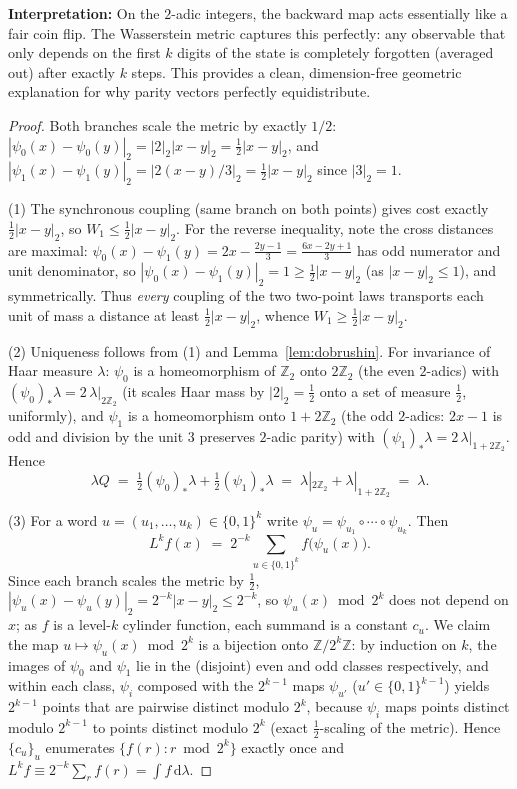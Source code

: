\documentclass[11pt]{amsart}
\theoremstyle{definition}
\theoremstyle{remark}
\newcommand{\Z}{\mathbb{Z}}
\newcommand{\Ztwo}{\Z_2}
\newcommand{\dW}{W_1}
\begin{document}
\textbf{Interpretation:}
On the $2$-adic integers, the backward map acts essentially like a fair coin flip. The Wasserstein metric captures this perfectly: any observable that only depends on the first $k$ digits of the state is completely forgotten (averaged out) after exactly $k$ steps. This provides a clean, dimension-free geometric explanation for why parity vectors perfectly equidistribute.

\begin{proof}
Both branches scale the metric by exactly $1/2$: $|\psi_0(x)-\psi_0(y)|_2 = |2|_2 |x-y|_2 = \tfrac12|x-y|_2$, and $|\psi_1(x)-\psi_1(y)|_2 = |2(x-y)/3|_2 = \tfrac12 |x-y|_2$ since $|3|_2 = 1$.

(1) The synchronous coupling (same branch on both points) gives cost exactly $\tfrac12|x-y|_2$, so $\dW \le \tfrac12 |x-y|_2$. For the reverse inequality, note the cross distances are maximal: $\psi_0(x) - \psi_1(y) = 2x - \tfrac{2y-1}{3} = \tfrac{6x - 2y + 1}{3}$ has odd numerator and unit denominator, so $|\psi_0(x)-\psi_1(y)|_2 = 1 \ge \tfrac12|x-y|_2$ (as $|x-y|_2 \le 1$), and symmetrically. Thus \emph{every} coupling of the two two-point laws transports each unit of mass a distance at least $\tfrac12|x-y|_2$, whence $\dW \ge \tfrac12|x-y|_2$.

(2) Uniqueness follows from (1) and Lemma~\ref{lem:dobrushin}. For invariance of Haar measure $\lambda$: $\psi_0$ is a homeomorphism of $\Ztwo$ onto $2\Ztwo$ (the even $2$-adics) with $(\psi_0)_*\lambda = 2\,\lambda|_{2\Ztwo}$ (it scales Haar mass by $|2|_2 = \tfrac12$ onto a set of measure $\tfrac12$, uniformly), and $\psi_1$ is a homeomorphism onto $1 + 2\Ztwo$ (the odd $2$-adics: $2x-1$ is odd and division by the unit $3$ preserves $2$-adic parity) with $(\psi_1)_*\lambda = 2\,\lambda|_{1+2\Ztwo}$. Hence
\[
\lambda Q \;=\; \tfrac12 (\psi_0)_*\lambda + \tfrac12 (\psi_1)_*\lambda \;=\; \lambda|_{2\Ztwo} + \lambda|_{1+2\Ztwo} \;=\; \lambda .
\]

(3) For a word $u = (u_1,\dots,u_k) \in \{0,1\}^k$ write $\psi_u = \psi_{u_1} \circ \cdots \circ \psi_{u_k}$. Then
\[
L^k f(x) \;=\; 2^{-k} \sum_{u \in \{0,1\}^k} f\bigl(\psi_u(x)\bigr).
\]
Since each branch scales the metric by $\tfrac12$, $|\psi_u(x) - \psi_u(y)|_2 = 2^{-k}|x-y|_2 \le 2^{-k}$, so $\psi_u(x) \bmod 2^k$ does not depend on $x$; as $f$ is a level-$k$ cylinder function, each summand is a constant $c_u$. We claim the map $u \mapsto \psi_u(x) \bmod 2^k$ is a bijection onto $\Z/2^k\Z$: by induction on $k$, the images of $\psi_0$ and $\psi_1$ lie in the (disjoint) even and odd classes respectively, and within each class, $\psi_i$ composed with the $2^{k-1}$ maps $\psi_{u'}$ ($u' \in \{0,1\}^{k-1}$) yields $2^{k-1}$ points that are pairwise distinct modulo $2^k$, because $\psi_i$ maps points distinct modulo $2^{k-1}$ to points distinct modulo $2^k$ (exact $\tfrac12$-scaling of the metric). Hence $\{c_u\}_u$ enumerates $\{f(r) : r \bmod 2^k\}$ exactly once and $L^k f \equiv 2^{-k}\sum_{r} f(r) = \int f \,\mathrm{d}\lambda$.
\end{proof}
\end{document}

